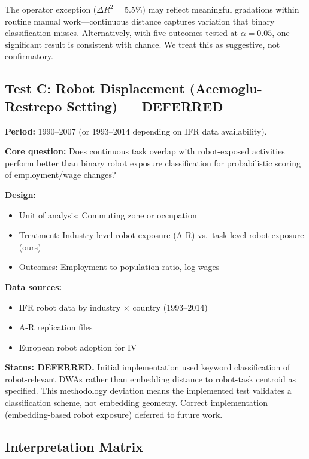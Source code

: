 \documentclass[12pt]{article}
\begin{document}
The operator exception ($\Delta R^2 = 5.5\%$) may reflect meaningful gradations within routine manual work---continuous distance captures variation that binary classification misses. Alternatively, with five outcomes tested at $\alpha = 0.05$, one significant result is consistent with chance. We treat this as suggestive, not confirmatory.


\subsection{Test C: Robot Displacement (Acemoglu-Restrepo Setting) --- DEFERRED}
\label{app:test-c}


\textbf{Period:} 1990--2007 (or 1993--2014 depending on IFR data availability).

\textbf{Core question:} Does continuous task overlap with robot-exposed activities perform better than binary robot exposure classification for probabilistic scoring of employment/wage changes?

\textbf{Design:}
\begin{itemize}
    \item Unit of analysis: Commuting zone or occupation
    \item Treatment: Industry-level robot exposure (A-R) vs.\ task-level robot exposure (ours)
    \item Outcomes: Employment-to-population ratio, log wages
\end{itemize}

\textbf{Data sources:}
\begin{itemize}
    \item IFR robot data by industry $\times$ country (1993--2014)
    \item A-R replication files
    \item European robot adoption for IV
\end{itemize}

\textbf{Status: DEFERRED.} Initial implementation used keyword classification of robot-relevant DWAs rather than embedding distance to robot-task centroid as specified. This methodology deviation means the implemented test validates a classification scheme, not embedding geometry. Correct implementation (embedding-based robot exposure) deferred to future work.


\subsection{Interpretation Matrix}
\end{document}
